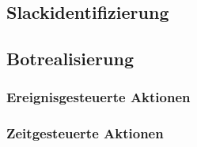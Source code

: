 



\subsection{Slackidentifizierung}


\subsection{Botrealisierung}
\subsubsection{Ereignisgesteuerte Aktionen}
\subsubsection{Zeitgesteuerte Aktionen}






